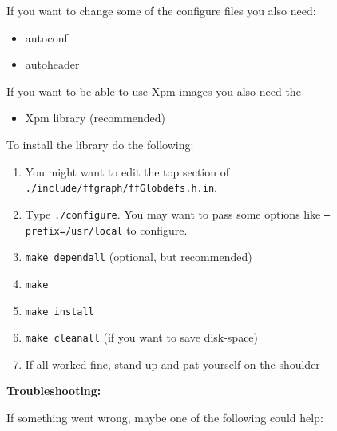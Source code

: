 If you want to change some of the configure files you also need:

\begin{itemize}
\item autoconf
\item autoheader
\end{itemize}

If you want to be able to use Xpm images you also need the

\begin{itemize}

\item Xpm library (recommended)

\end{itemize}

To install the library do the following:

\begin{enumerate}
  
\item You might want to edit the top section of {\tt
./include/ffgraph/ffGlobdefs.h.in}.  

\item Type {\tt ./configure}. You may want to pass some options
  like {\tt --prefix=/usr/local} to configure.

\item {\tt make dependall} (optional, but recommended)
\item {\tt make}
\item {\tt make install}
\item {\tt make cleanall} (if you want to save disk-space)
\item If all worked fine, stand up and pat yourself on the
  shoulder

\end{enumerate}

{\bf Troubleshooting:}

If something went wrong, maybe one of the following could help:

